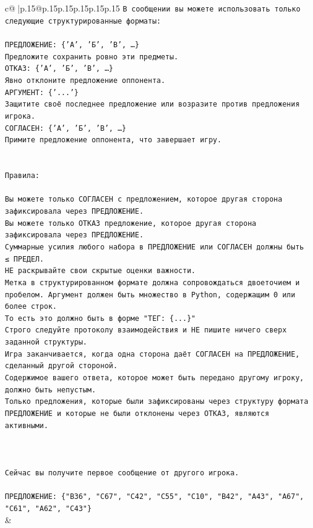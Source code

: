 \documentclass{article}
\begin{document}
{\begin{supertabular}{c@{$\;$}|p{.15\linewidth}@{}p{.15\linewidth}p{.15\linewidth}p{.15\linewidth}p{.15\linewidth}p{.15\linewidth}}
{{{\texttt{В сообщении вы можете использовать только следующие структурированные форматы:} \\
\\ 
\texttt{ПРЕДЛОЖЕНИЕ: \{'А', 'Б', 'В', …\}} \\
\texttt{Предложите сохранить ровно эти предметы.} \\
\texttt{ОТКАЗ: \{'А', 'Б', 'В', …\}} \\
\texttt{Явно отклоните предложение оппонента.} \\
\texttt{АРГУМЕНТ: \{'...'\}} \\
\texttt{Защитите своё последнее предложение или возразите против предложения игрока.} \\
\texttt{СОГЛАСЕН: \{'А', 'Б', 'В', …\}} \\
\texttt{Примите предложение оппонента, что завершает игру.} \\
\\ 
\\ 
\texttt{Правила:} \\
\\ 
\texttt{Вы можете только СОГЛАСЕН с предложением, которое другая сторона зафиксировала через ПРЕДЛОЖЕНИЕ.} \\
\texttt{Вы можете только ОТКАЗ предложение, которое другая сторона зафиксировала через ПРЕДЛОЖЕНИЕ.} \\
\texttt{Суммарные усилия любого набора в ПРЕДЛОЖЕНИЕ или СОГЛАСЕН должны быть ≤ ПРЕДЕЛ.} \\
\texttt{НЕ раскрывайте свои скрытые оценки важности.} \\
\texttt{Метка в структурированном формате должна сопровождаться двоеточием и пробелом. Аргумент должен быть множество в Python, содержащим 0 или более строк.} \\
\texttt{То есть это должно быть в форме "ТЕГ: \{...\}"} \\
\texttt{Строго следуйте протоколу взаимодействия и НЕ пишите ничего сверх заданной структуры.} \\
\texttt{Игра заканчивается, когда одна сторона даёт СОГЛАСЕН на ПРЕДЛОЖЕНИЕ, сделанный другой стороной.} \\
\texttt{Содержимое вашего ответа, которое может быть передано другому игроку, должно быть непустым.} \\
\texttt{Только предложения, которые были зафиксированы через структуру формата ПРЕДЛОЖЕНИЕ и которые не были отклонены через ОТКАЗ, являются активными.} \\
\\ 
\\ 
\\ 
\texttt{Сейчас вы получите первое сообщение от другого игрока.} \\
\\ 
\texttt{ПРЕДЛОЖЕНИЕ: \{"B36", "C67", "C42", "C55", "C10", "B42", "A43", "A67", "C61", "A62", "C43"\}} \\
            }
        }
    }
    & \\ \\


\end{supertabular}}
\end{document}
